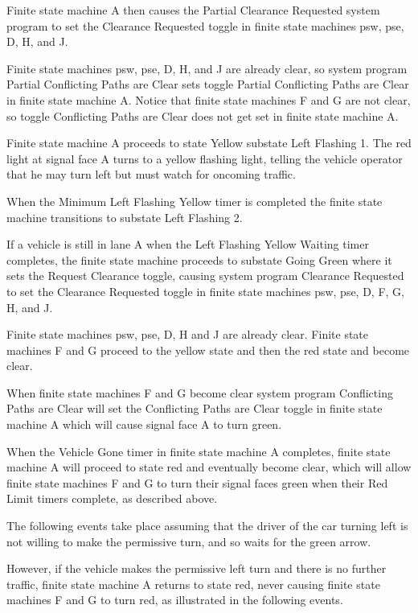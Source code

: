 \documentclass[letterpaper,twoside]{article}
\begin{document}
Finite state machine A then causes the Partial Clearance Requested system
program to set the Clearance Requested toggle in finite state machines
psw, pse, D, H, and J.

Finite state machines psw, pse, D, H, and J are already clear,
so system program Partial Conflicting Paths are Clear sets toggle
Partial Conflicting Paths are Clear in finite state machine A.
Notice that finite state machines F and G are not clear,
so toggle Conflicting Paths are Clear does not get set in
finite state machine A.

Finite state machine A proceeds to state Yellow substate Left Flashing 1.
The red light at signal face A turns to a yellow flashing light,
telling the vehicle operator that he may turn left but must watch for
oncoming traffic.

When the Minimum Left Flashing Yellow timer is completed the finite
state machine transitions to substate Left Flashing 2.

If a vehicle is still in lane A when the Left Flashing Yellow Waiting
timer completes, the finite state machine proceeds to substate
Going Green where it sets the Request Clearance toggle,
causing system program Clearance Requested to set the Clearance Requested
toggle in finite state machines psw, pse, D, F, G, H, and J.

Finite state machines psw, pse, D, H and J are already clear.
Finite state machines F and G proceed to the yellow state
and then the red state and become clear.

When finite state machines F and G become clear system program
Conflicting Paths are Clear will set the Conflicting Paths are Clear
toggle in finite state machine A which will cause signal face A to turn green.

When the Vehicle Gone timer in finite state machine A
completes, finite state machine A will proceed to state red and eventually
become clear, which will allow finite state machines F and G to turn
their signal faces green when their Red Limit timers complete,
as described above.

The following events take place assuming that the driver of the
car turning left is not willing to make the permissive turn,
and so waits for the green arrow.



However, if the vehicle makes the permissive left turn and there is
no further traffic, finite state machine A
returns to state red, never causing finite state machines F and G to turn red,
as illustrated in the following events.
\end{document}
